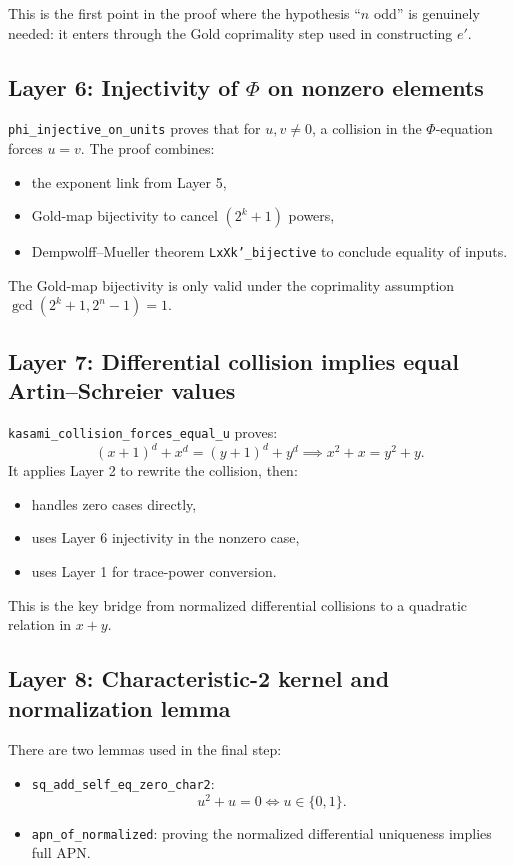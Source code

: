 \documentclass[11pt]{article}
\begin{document}
This is the first point in the proof where the hypothesis ``$n$ odd'' is genuinely needed:
it enters through the Gold coprimality step used in constructing $e'$.

\subsection*{Layer 6: Injectivity of $\Phi$ on nonzero elements}
\texttt{phi\_injective\_on\_units} proves that for $u,v\neq 0$, a collision in the $\Phi$-equation forces $u=v$.
The proof combines:
\begin{itemize}
  \item the exponent link from Layer 5,
  \item Gold-map bijectivity to cancel $(2^k+1)$ powers,
  \item Dempwolff--Mueller theorem \texttt{LxXk'\_bijective} to conclude equality of inputs.
\end{itemize}

The Gold-map bijectivity is only valid under the coprimality assumption $\gcd(2^k+1,2^n-1)=1$.

\subsection*{Layer 7: Differential collision implies equal Artin--Schreier values}
\texttt{kasami\_collision\_forces\_equal\_u} proves:
\[
  (x+1)^d+x^d=(y+1)^d+y^d \implies x^2+x=y^2+y.
\]
It applies Layer 2 to rewrite the collision, then:
\begin{itemize}
  \item handles zero cases directly,
  \item uses Layer 6 injectivity in the nonzero case,
  \item uses Layer 1 for trace-power conversion.
\end{itemize}

This is the key bridge from normalized differential collisions to a quadratic relation in $x+y$.

\subsection*{Layer 8: Characteristic-2 kernel and normalization lemma}
There are two lemmas used in the final step:
\begin{itemize}
  \item \texttt{sq\_add\_self\_eq\_zero\_char2}:
  \[
    u^2+u=0 \iff u\in\{0,1\}.
  \]
  \item \texttt{apn\_of\_normalized}: proving the normalized differential uniqueness
  implies full APN.
\end{itemize}
\end{document}
